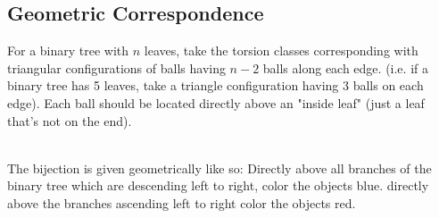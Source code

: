 \documentclass{article}
\begin{document}
\subsection{Geometric Correspondence}
For a binary tree with $n$ leaves, take the torsion classes corresponding with triangular configurations of balls having $n-2$ balls along each edge. (i.e. if a binary tree has 5 leaves, take a triangle configuration having 3 balls on each edge). Each ball should be located directly above an "inside leaf" (just a leaf that's not on the end). \\
\\
\begin{center}
\end{center}
The bijection is given geometrically like so: Directly above all branches of the binary tree which are descending left to right, color the objects blue. directly above the branches ascending left to right color the objects red. \\
\end{document}
